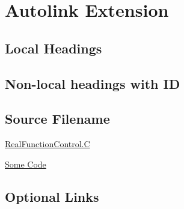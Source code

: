 
\chapter{\label{autolink-extension}Autolink Extension}
\par 
\par 
\section{\label{local-headings}Local Headings}
\par 
\par 
\section{\label{non-local-headings-with-id}Non-local headings with ID}
\par 
\par 
\section{\label{source-filename}Source Filename}
\par \href{XXXXXXXX-XXXX-XXXX-XXXX-XXXXXXXXXXXX}{RealFunctionControl.C}
\par \href{XXXXXXXX-XXXX-XXXX-XXXX-XXXXXXXXXXXX}{Some Code}
\section{\label{optional-links}Optional Links}
\par  
